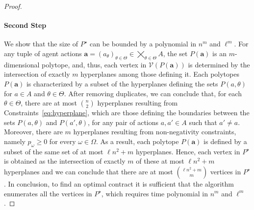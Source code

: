 \begin{proof}
	\paragraph{Second Step}
	We show that the size of $P^\star$ can be bounded by a polynomial in $n^m$ and $\ell^m$.
	For any tuple of agent actions $\textbf{a}=(a_\theta)_{\theta \in \Theta} \in \bigtimes_{\theta \in \Theta} A$, the set $P(\textbf{a})$ is an $m$-dimensional polytope, and, thus, each vertex in $\mathcal{V}(P(\textbf{a}))$ is determined by the intersection of exactly $m$ hyperplanes among those defining it.
	Each polytopes $P(\textbf{a})$ is characterized by a subset of the hyperplanes defining the sets $P(a,\theta)$ for $a \in A$ and $\theta \in \Theta$.
	After removing duplicates, we can conclude that, for each $\theta \in \Theta$, there are at most $\binom{n}{2}$ hyperplanes resulting from Constraints~\ref{eq:hyperplane}, which are those defining the boundaries between the sets $P(a,\theta)$ and $P(a',\theta)$, for any pair of actions $a, a' \in A$ such that $a' \neq a$.
	Moreover, there are $m$ hyperplanes resulting from non-negativity constraints, namely $p_\omega \geq 0$ for every $\omega \in \Omega$.
	As a result, each polytope $P(\textbf{a})$ is defined by a subset of the same set of at most $\ell n^2 + m$ hyperplanes.
	Hence, each vertex in $P^\star$ is obtained as the intersection of exactly $m$ of these at most $\ell n^2 + m$ hyperplanes and we can conclude that there are at most $\binom{\ell n^2+m}{m}$ vertices in $P^\star$.
	In conclusion, to find an optimal contract it is sufficient that the algorithm enumerates all the vertices in $P^\star$, which requires time polynomial in $n^m$ and $\ell^m$.
\end{proof}